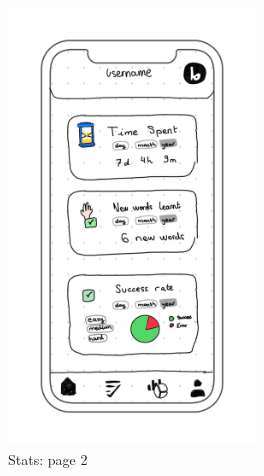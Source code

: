 \begin{figure}[H]
\begin{subfigure}[T]{0.32\textwidth}
        \includegraphics[width=0.72\textwidth]{assets/screens/stats/Stats - 2.png}
        \caption{Stats: page 2}
        \label{fig:design_screen_stats_2}
    \end{subfigure}
    \hfill
    \begin{subfigure}[T]{0.32\textwidth}
        \centering

\end{subfigure}
\end{figure}
